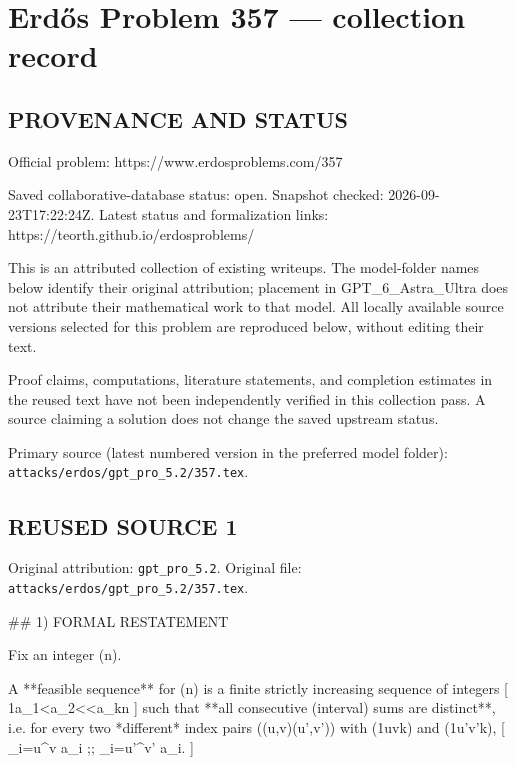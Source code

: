 \section*{Erd\H{o}s Problem 357 --- collection record}

\subsection*{PROVENANCE AND STATUS}
Official problem: https://www.erdosproblems.com/357

Saved collaborative-database status: open.
Snapshot checked: 2026-09-23T17:22:24Z.
Latest status and formalization links: https://teorth.github.io/erdosproblems/

This is an attributed collection of existing writeups. The model-folder names below identify their original attribution; placement in GPT\_6\_Astra\_Ultra does not attribute their mathematical work to that model. All locally available source versions selected for this problem are reproduced below, without editing their text.

Proof claims, computations, literature statements, and completion estimates in the reused text have not been independently verified in this collection pass. A source claiming a solution does not change the saved upstream status.

Primary source (latest numbered version in the preferred model folder): \texttt{attacks/erdos/gpt\_pro\_5.2/357.tex}.

\subsection*{REUSED SOURCE 1}
Original attribution: \texttt{gpt\_pro\_5.2}.
Original file: \texttt{attacks/erdos/gpt\_pro\_5.2/357.tex}.

## 1) FORMAL RESTATEMENT

Fix an integer (n).

A **feasible sequence** for (n) is a finite strictly increasing sequence of integers
[
1\le a_1<a_2<\cdots<a_k\le n
]
such that **all consecutive (interval) sums are distinct**, i.e. for every two *different* index pairs ((u,v)\neq(u',v')) with (1\le u\le v\le k) and (1\le u'\le v'\le k),
[
\sum_{i=u}^{v} a_i ;\neq; \sum_{i=u'}^{v'} a_i.
]

